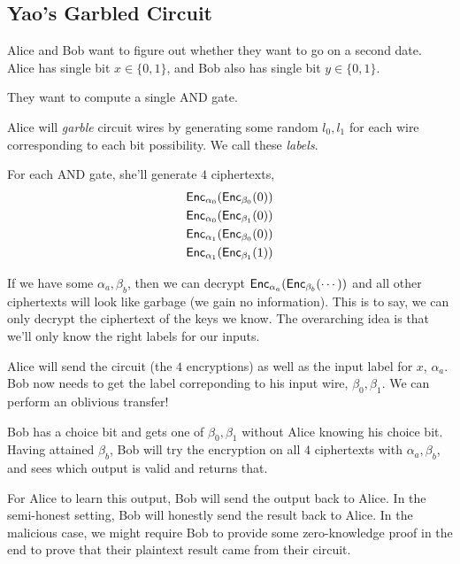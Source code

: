 \subsection{Yao's Garbled Circuit}

\begin{example}
    Alice and Bob want to figure out whether they want to go on a second date. Alice has single bit $x\in\{0,1\}$, and Bob also has single bit $y\in\{0,1\}$.

    They want to compute a single \textsf{AND} gate.

    Alice will \emph{garble} circuit wires by generating some random $l_0, l_1$ for each wire corresponding to each bit possibility. We call these \emph{labels}.

    

    For each \textsf{AND} gate, she'll generate $4$ ciphertexts,
    \begin{align*}
        \operatorname{\mathsf{Enc}}_{\alpha_0}(\operatorname{\mathsf{Enc}}_{\beta_0}(0)) \\
        \operatorname{\mathsf{Enc}}_{\alpha_0}(\operatorname{\mathsf{Enc}}_{\beta_1}(0)) \\
        \operatorname{\mathsf{Enc}}_{\alpha_1}(\operatorname{\mathsf{Enc}}_{\beta_0}(0)) \\
        \operatorname{\mathsf{Enc}}_{\alpha_1}(\operatorname{\mathsf{Enc}}_{\beta_1}(1))
    \end{align*}

    If we have some $\alpha_a, \beta_b$, then we can decrypt $\operatorname{\mathsf{Enc}}_{\alpha_a}(\operatorname{\mathsf{Enc}}_{\beta_b}(\cdots))$ and all other ciphertexts will look like garbage (we gain no information). This is to say, we can only decrypt the ciphertext of the keys we know. The overarching idea is that we'll only know the right labels for our inputs.

    Alice will send the circuit (the $4$ encryptions) as well as the input label for $x$, $\alpha_a$. Bob now needs to get the label correponding to his input wire, $\beta_0, \beta_1$. We can perform an oblivious transfer!

    Bob has a choice bit and gets one of $\beta_0, \beta_1$ without Alice knowing his choice bit. Having attained $\beta_b$, Bob will try the encryption on all $4$ ciphertexts with $\alpha_a, \beta_b$, and sees which output is valid and returns that.

    For Alice to learn this output, Bob will send the output back to Alice. In the semi-honest setting, Bob will honestly send the result back to Alice. In the malicious case, we might require Bob to provide some zero-knowledge proof in the end to prove that their plaintext result came from their circuit.
\end{example}

